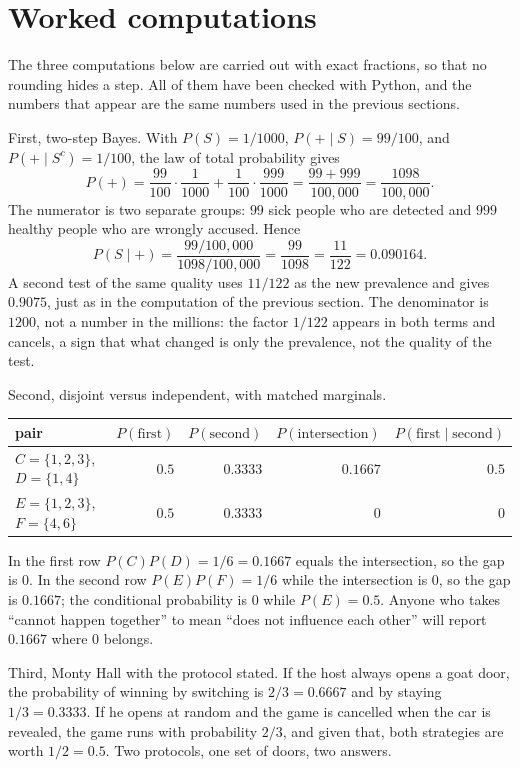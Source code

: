 \section{Worked computations}

The three computations below are carried out with exact fractions, so that no rounding hides
a step. All of them have been checked with Python, and the numbers that appear are the same
numbers used in the previous sections.

First, two-step Bayes. With $P(S)=1/1000$, $P(+\mid S)=99/100$, and
$P(+\mid S^{c})=1/100$, the law of total probability gives
\[
P(+)=\frac{99}{100}\cdot\frac{1}{1000}+\frac{1}{100}\cdot\frac{999}{1000}
=\frac{99+999}{100{,}000}=\frac{1098}{100{,}000}.
\]
The numerator is two separate groups: $99$ sick people who are detected and $999$ healthy
people who are wrongly accused. Hence
\[
P(S\mid +)=\frac{99/100{,}000}{1098/100{,}000}=\frac{99}{1098}=\frac{11}{122}=0.090164 .
\]
A second test of the same quality uses $11/122$ as the new prevalence and gives $0.9075$,
just as in the computation of the previous section. The denominator is $1200$, not a number
in the millions: the factor $1/122$ appears in both terms and cancels, a sign that what
changed is only the prevalence, not the quality of the test.

Second, disjoint versus independent, with matched marginals.

\begin{center}
\small
\begin{tabular}{lrrrr}
\hline
pair & $P(\text{first})$ & $P(\text{second})$ & $P(\text{intersection})$ & $P(\text{first}\mid\text{second})$ \\
\hline
$C=\{1,2,3\}$, $D=\{1,4\}$ & $0.5$ & $0.3333$ & $0.1667$ & $0.5$ \\
$E=\{1,2,3\}$, $F=\{4,6\}$ & $0.5$ & $0.3333$ & $0$ & $0$ \\
\hline
\end{tabular}
\end{center}

In the first row $P(C)P(D)=1/6=0.1667$ equals the intersection, so the gap is $0$. In the
second row $P(E)P(F)=1/6$ while the intersection is $0$, so the gap is $0.1667$; the
conditional probability is $0$ while $P(E)=0.5$. Anyone who takes ``cannot happen together''
to mean ``does not influence each other'' will report $0.1667$ where $0$ belongs.

Third, Monty Hall with the protocol stated. If the host always opens a goat door, the
probability of winning by switching is $2/3=0.6667$ and by staying $1/3=0.3333$. If he opens
at random and the game is cancelled when the car is revealed, the game runs with probability
$2/3$, and given that, both strategies are worth $1/2=0.5$. Two protocols, one set of doors,
two answers.

